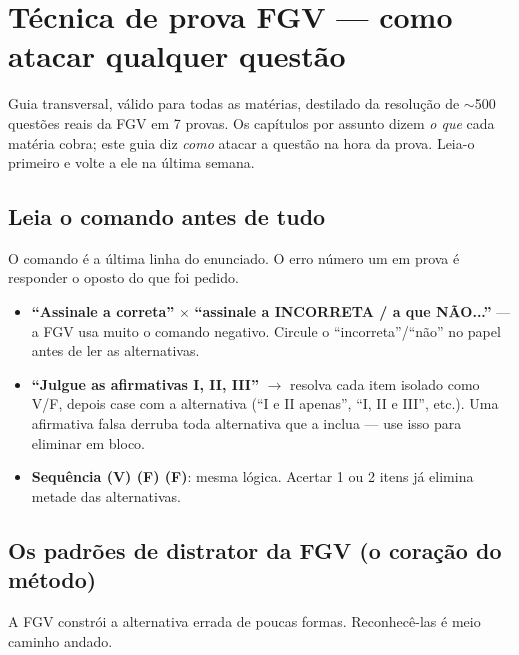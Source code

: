 \chapter{Técnica de prova FGV --- como atacar qualquer questão}

Guia transversal, válido para todas as matérias, destilado da resolução de
${\sim}$500 questões reais da FGV em 7 provas. Os capítulos por assunto dizem
\emph{o que} cada matéria cobra; este guia diz \emph{como} atacar a questão
na hora da prova. Leia-o primeiro e volte a ele na última semana.

\section{Leia o comando antes de tudo}

O comando é a última linha do enunciado. O erro número um em prova é responder
o oposto do que foi pedido.

\begin{itemize}
\item \textbf{``Assinale a correta''} $\times$ \textbf{``assinale a
INCORRETA / a que NÃO...''} --- a FGV usa muito o comando negativo. Circule o
``incorreta''/``não'' no papel antes de ler as alternativas.
\item \textbf{``Julgue as afirmativas I, II, III''} $\to$ resolva cada item
isolado como V/F, depois case com a alternativa (``I e II apenas'', ``I, II e
III'', etc.). Uma afirmativa falsa derruba toda alternativa que a inclua ---
use isso para eliminar em bloco.
\item \textbf{Sequência (V) (F) (F)}: mesma lógica. Acertar 1 ou 2 itens já
elimina metade das alternativas.
\end{itemize}

\section{Os padrões de distrator da FGV (o coração do método)}

A FGV constrói a alternativa errada de poucas formas. Reconhecê-las é meio
caminho andado.


